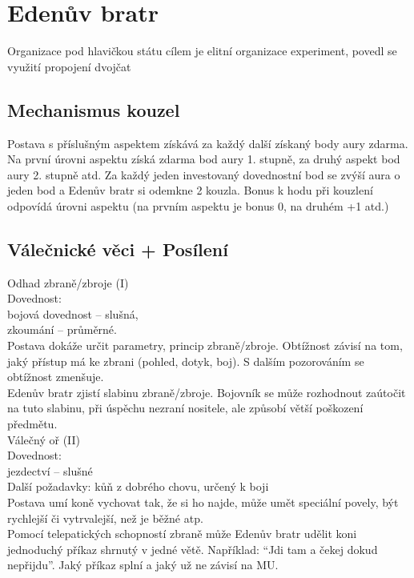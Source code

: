 \section{Edenův bratr}
\label{sec:edenuvbratr}

Organizace
pod hlavičkou státu
cílem je elitní organizace
experiment, povedl se
využití propojení dvojčat

\subsection{Mechanismus kouzel}
\label{sec:eden-mech-kouzla}

Postava s příslušným aspektem získává za každý další získaný body aury zdarma. Na první úrovni aspektu získá zdarma bod aury 1. stupně, za druhý aspekt bod aury 2. stupně atd. Za každý jeden investovaný dovednostní bod se zvýší aura o jeden bod a Edenův bratr si odemkne 2 kouzla. Bonus k hodu při kouzlení odpovídá úrovni aspektu (na prvním aspektu je bonus 0, na druhém +1 atd.)\\

\subsection{Válečnické věci + Posílení}
\label{sec:eden-valecnici-posileni}

Odhad zbraně/zbroje (I)\\
Dovednost:\\
bojová dovednost – slušná,\\
zkoumání – průměrné.\\
Postava dokáže určit parametry, princip zbraně/zbroje. Obtížnost závisí na tom, jaký přístup má ke zbrani (pohled, dotyk, boj). S dalším pozorováním se obtížnost zmenšuje.\\
Edenův bratr zjistí slabinu zbraně/zbroje. Bojovník se může rozhodnout zaútočit na tuto slabinu, při úspěchu nezraní nositele, ale způsobí větší poškození předmětu.\\


Válečný oř (II)\\
Dovednost:\\
 jezdectví – slušné\\
Další požadavky: kůň z dobrého chovu, určený k boji\\
Postava umí koně vychovat tak, že si ho najde, může umět speciální povely, být rychlejší či vytrvalejší, než je běžné atp.\\
Pomocí telepatických schopností zbraně může Edenův bratr udělit koni jednoduchý příkaz shrnutý v jedné větě. Například: “Jdi tam a čekej dokud nepřijdu”. Jaký příkaz splní a jaký už ne závisí na MU.\\

